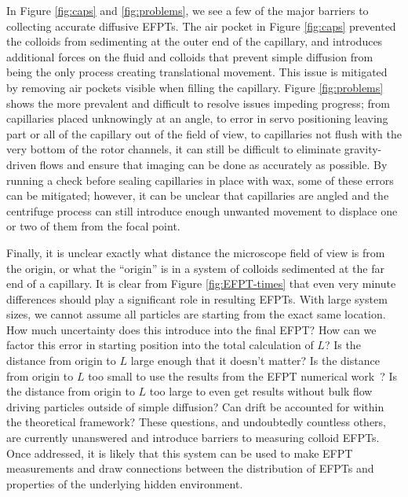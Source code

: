 In Figure \ref{fig:caps} and \ref{fig:problems}, we see a few of the major barriers to collecting accurate diffusive EFPTs. The air pocket in Figure \ref{fig:caps} prevented the colloids from sedimenting at the outer end of the capillary, and introduces additional forces on the fluid and colloids that prevent simple diffusion from being the only process creating translational movement. This issue is mitigated by removing air pockets visible when filling the capillary. Figure \ref{fig:problems} shows the more prevalent and difficult to resolve issues impeding progress; from capillaries placed unknowingly at an angle, to error in servo positioning leaving part or all of the capillary out of the field of view, to capillaries not flush with the very bottom of the rotor channels, it can still be difficult to eliminate gravity-driven flows and ensure that imaging can be done as accurately as possible. By running a check before sealing capillaries in place with wax, some of these errors can be mitigated; however, it can be unclear that capillaries are angled and the centrifuge process can still introduce enough unwanted movement to displace one or two of them from the focal point. 

Finally, it is unclear exactly what distance the microscope field of view is from the origin, or what the ``origin'' is in a system of colloids sedimented at the far end of a capillary. It is clear from Figure \ref{fig:EFPT-times} that even very minute differences should play a significant role in resulting EFPTs. With large system sizes, we cannot assume all particles are starting from the exact same location. How much uncertainty does this introduce into the final EFPT? How can we factor this error in starting position into the total calculation of $L$? Is the distance from origin to $L$ large enough that it doesn't matter? Is the distance from origin to $L$ too small to use the results from the EFPT numerical work~\cite{hass_first-passage_2024,hass_extreme_2024}? Is the distance from origin to $L$ too large to even get results without bulk flow driving particles outside of simple diffusion? Can drift be accounted for within the theoretical framework? These questions, and undoubtedly countless others, are currently unanswered and introduce barriers to measuring colloid EFPTs. Once addressed, it is likely that this system can be used to make EFPT measurements and draw connections between the distribution of EFPTs and properties of the underlying hidden environment.


